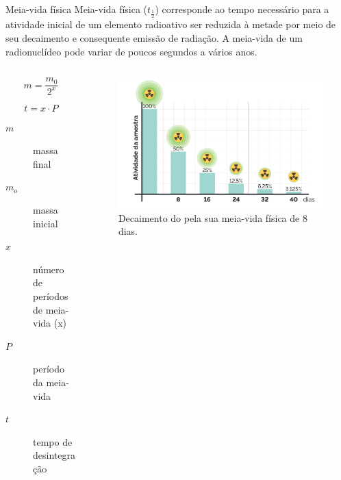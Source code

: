 \documentclass[presentation,professionalfonts,aspectratio=169]{beamer}
\begin{document}
\begin{frame}[label={sec:orgb153a58}]{Meia-vida física}
Meia-vida física (\(t_{\frac{1}{2}}\)) corresponde ao tempo necessário para a atividade inicial de um elemento radioativo ser reduzida à metade por meio de seu decaimento e consequente emissão de radiação. A meia-vida de um radionuclídeo pode variar de poucos segundos a vários anos.



\begin{columns}
\begin{column}{0.45\columnwidth}
\begin{equation}
m=\frac{m_0}{2^x}
\end{equation}

\begin{equation}
t=x\cdot P
\end{equation}

\begin{description}
\item[{\(m\)}] massa final
\item[{\(m_o\)}] massa inicial
\item[{\(x\)}] número de períodos de meia-vida (x)
\item[{\(P\)}] período da meia-vida
\item[{\(t\)}] tempo de desintegração
\end{description}
\end{column}



\begin{column}{0.45\columnwidth}
\begin{figure}[H]
\centering
\includegraphics[scale=0.21]{FQ/Radioatividade/meia-vida.png}
\caption{\label{fig:orgf422151}Decaimento do    pela sua meia-vida física de 8 dias.}
\end{figure}
\end{column}
\end{columns}
\end{frame}
\end{document}
